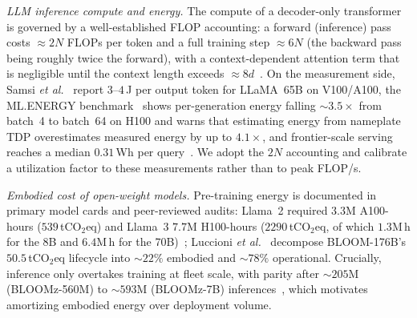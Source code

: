 \documentclass[journal]{IEEEtran}
\begin{document}
\textit{LLM inference compute and energy.} The compute of a decoder-only transformer is governed by
a well-established FLOP accounting: a forward (inference) pass costs $\approx 2N$ FLOPs per token and
a full training step $\approx 6N$ (the backward pass being roughly twice the forward), with a
context-dependent attention term that is negligible until the context length exceeds
$\approx 8d$~\cite{kaplan2020scaling,deepmind_scaling_book}. On the measurement side, Samsi
\emph{et al.}~\cite{samsi2023words} report $3$--$4$\,J per output token for LLaMA~65B on V100/A100,
the ML.ENERGY benchmark~\cite{mlenergy2025} shows per-generation energy falling $\sim\!3.5\times$
from batch~4 to batch~64 on H100 and warns that estimating energy from nameplate TDP overestimates
measured energy by up to $4.1\times$, and frontier-scale serving reaches a median $0.31$\,Wh per
query~\cite{oviedo2026joule}. We adopt the $2N$ accounting and calibrate a utilization factor to
these measurements rather than to peak FLOP/s.

\textit{Embodied cost of open-weight models.} Pre-training energy is documented in primary model
cards and peer-reviewed audits: Llama~2 required $3.3$M A100-hours ($539$\,tCO$_2$eq) and Llama~3
$7.7$M H100-hours ($2290$\,tCO$_2$eq, of which $1.3$M\,h for the 8B and $6.4$M\,h for the
70B)~\cite{touvron2023llama2,llama3card}; Luccioni \emph{et al.}~\cite{luccioni2023bloom} decompose
BLOOM-176B's $50.5$\,tCO$_2$eq lifecycle into $\sim\!22\%$ embodied and $\sim\!78\%$ operational.
Crucially, inference only overtakes training at fleet scale, with parity after $\sim\!205$M
(BLOOMz-560M) to $\sim\!593$M (BLOOMz-7B) inferences~\cite{luccioni2024power}, which motivates
amortizing embodied
energy over deployment volume.
\end{document}
